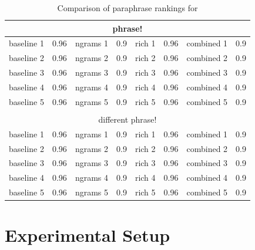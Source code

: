 \documentclass[11pt]{article}
\begin{document}
\begin{table}[t]
\small
\begin{center}
\begin{tabular}{|cl|cl|cl|cl|}
  \hline
  \multicolumn{8}{|c|}{phrase!} \\
  \hline
  baseline 1 & 0.96 &
  ngrams 1 & 0.9 &
  rich 1 & 0.96 &
  combined 1 & 0.9 \\

  baseline 2 & 0.96 &
  ngrams 2 & 0.9 &
  rich 2 & 0.96 &
  combined 2 & 0.9 \\

  baseline 3 & 0.96 &
  ngrams 3 & 0.9 &
  rich 3 & 0.96 &
  combined 3 & 0.9 \\


  baseline 4 & 0.96 &
  ngrams 4 & 0.9 &
  rich 4 & 0.96 &
  combined 4 & 0.9 \\


  baseline 5 & 0.96 &
  ngrams 5 & 0.9 &
  rich 5 & 0.96 &
  combined 5 & 0.9 \\

  \hline
  \multicolumn{8}{c}{} \\
  \hline
  \multicolumn{8}{|c|}{different phrase!} \\
  \hline
  baseline 1 & 0.96 &
  ngrams 1 & 0.9 &
  rich 1 & 0.96 &
  combined 1 & 0.9 \\

  baseline 2 & 0.96 &
  ngrams 2 & 0.9 &
  rich 2 & 0.96 &
  combined 2 & 0.9 \\

  baseline 3 & 0.96 &
  ngrams 3 & 0.9 &
  rich 3 & 0.96 &
  combined 3 & 0.9 \\


  baseline 4 & 0.96 &
  ngrams 4 & 0.9 &
  rich 4 & 0.96 &
  combined 4 & 0.9 \\


  baseline 5 & 0.96 &
  ngrams 5 & 0.9 &
  rich 5 & 0.96 &
  combined 5 & 0.9 \\

  \hline
\end{tabular}
\end{center}
\normalsize
\caption{Comparison of paraphrase rankings for }
\label{grammar_stats}
\end{table}


\section{Experimental Setup}
\label{sec-setup}
\end{document}
